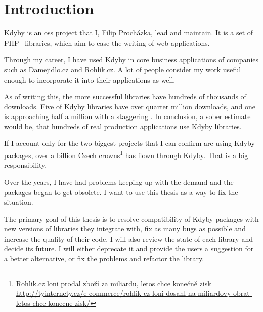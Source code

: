 \chapter{Introduction}

Kdyby is an \gls{oss} project that I, Fi\-li\-p P\-ro\-chá\-z\-ka, lead and maintain. It is a set of PHP~\cite{php:manual:about} libraries, which aim to ease the writing of web applications.

Through my career, I have used Kdyby in core business applications of companies such as Damejidlo.cz and Rohlik.cz. A lot of people consider my work useful enough to incorporate it into their applications as well.

As of writing this, the more successful libraries have hundreds of thousands of downloads. Five of Kdyby libraries have over quarter million downloads, and one is approaching half a million with a staggering . In conclusion, a sober estimate would be, that hundreds of real production applications use Kdyby libraries.

If I account only for the two biggest projects that I can confirm are using Kdyby packages, over a billion Czech crowns\footnote{Rohlik.cz loni prodal zboží za miliardu, letos chce konečně zisk \\\url{http://tyinternety.cz/e-commerce/rohlik-cz-loni-dosahl-na-miliardovy-obrat-letos-chce-konecne-zisk/}} has flown through Kdyby. That is a big responsibility.

Over the years, I have had problems keeping up with the demand and the packages began to get obsolete. I want to use this thesis as a way to fix the situation.

The primary goal of this thesis is to resolve compatibility of Kdyby packages with new versions of libraries they integrate with, fix as many bugs as possible and increase the quality of their code. I will also review the state of each library and decide its future. I will either deprecate it and provide the users a suggestion for a better alternative, or fix the problems and refactor the library.
